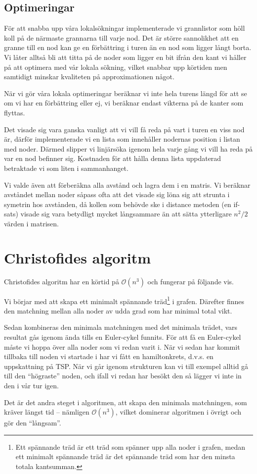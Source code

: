 \documentclass[a4paper,12pt]{article}
\renewcommand{\O}{\ensuremath{\mathcal{O}}}
\renewcommand{\*}{\ensuremath{\cdot}}
\begin{document}
\subsection{Optimeringar}

För att snabba upp våra lokalsökningar implementerade vi grannlistor som höll
koll på de närmaste grannarna till varje nod. Det är större sannolikhet att en
granne till en nod kan ge en förbättring i turen än en nod som ligger långt
borta. Vi låter alltså bli att titta på de noder som ligger en bit ifrån den
kant vi håller på att optimera med vår lokala sökning, vilket snabbar upp
körtiden men samtidigt minskar kvaliteten på approximationen något.

När vi gör våra lokala optimeringar beräknar vi inte hela turens längd för att
se om vi har en förbättring eller ej, vi beräknar endast vikterna på de kanter
som flyttas.

Det visade sig vara ganska vanligt att vi vill få reda på vart i turen en viss
nod är, därför implementerade vi en lista som innehåller nodernas position i
listan med noder. Därmed slipper vi linjärsöka igenom hela varje gång vi vill ha
reda på var en nod befinner sig. Kostnaden för att hålla denna lista uppdaterad
betraktade vi som liten i sammanhanget.

Vi valde även att förberäkna alla avstånd och lagra dem i en matris. Vi beräknar
avståndet mellan noder såpass ofta att det visade sig löna sig att strunta i
symetrin hos avstånden, då kollen som behövde ske i distance metoden (en
if-sats) visade sig vara betydligt mycket långsammare än att sätta ytterligare
$n^2/2$ värden i matrisen.



\section{Christofides algoritm} 

Christofides algoritm har en körtid på $\O(n^3)$ och fungerar på följande vis.

Vi börjar med att skapa ett minimalt spännande träd\footnote{Ett spännande träd
är ett träd som spänner upp alla noder i grafen, medan ett minimalt spännande
träd är det spännande träd som har den minsta totala kantsumman.} i grafen.
Därefter finnes den matchning mellan alla noder av udda grad som har minimal 
total vikt.  

Sedan kombineras den minimala matchningen med det minimala trädet, vars resultat
gås igenom ända tills en Euler-cykel funnits. För att få en Euler-cykel måste vi
hoppa över alla noder som vi redan varit i. När vi sedan har kommit tillbaka
till noden vi startade i har vi fått en hamiltonkrets, d.v.s. en uppskattning på
TSP.  När vi går igenom strukturen kan vi till exempel alltid gå till den
``högraste'' noden, och ifall vi redan har besökt den så lägger vi inte in den i
vår tur igen.

Det är det andra steget i algoritmen, att skapa den minimala matchningen, som
kräver längst tid -- nämligen $\O(n^3)$, vilket dominerar algoritmen i övrigt och
gör den ``långsam''.
\end{document}
